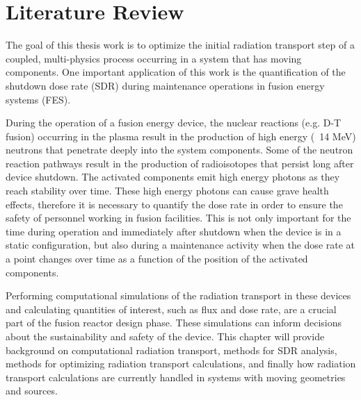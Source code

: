 \chapter{Literature Review} \label{ch:litrev}

The goal of this thesis work is to optimize the initial radiation transport step of a
coupled, multi-physics process occurring in a system that has moving components.  One
important application of this work is the quantification of the shutdown dose
rate (SDR) during maintenance operations in fusion energy systems (FES).

During the operation of a fusion energy device, the nuclear reactions (e.g. D-T
fusion) occurring in the plasma result in the production of high energy (~14 MeV) neutrons
that penetrate deeply into the system components.  Some of the neutron reaction
pathways result in the production of radioisotopes that persist long after
device shutdown.  The activated components emit high energy photons as they
reach stability over time.  These high energy photons
can cause grave health effects, therefore it is necessary to     
quantify the dose rate in order to ensure the safety of personnel working in
fusion facilities.  This is not only important for the time during operation
and immediately after shutdown when the device is in a static configuration,
but also during a maintenance activity 
when the dose rate at a point changes over
time as a function of the position of the activated components.

Performing computational simulations of the radiation transport in these
devices and calculating quantities of interest, such as flux and dose rate, are
a crucial part of the fusion reactor design phase.  These simulations can
inform decisions about the sustainability and safety of the device.  
This chapter will provide background on computational radiation
transport, methods for SDR analysis, methods for optimizing radiation transport
calculations, and finally  how radiation transport calculations are currently
handled in systems with moving geometries and sources.





